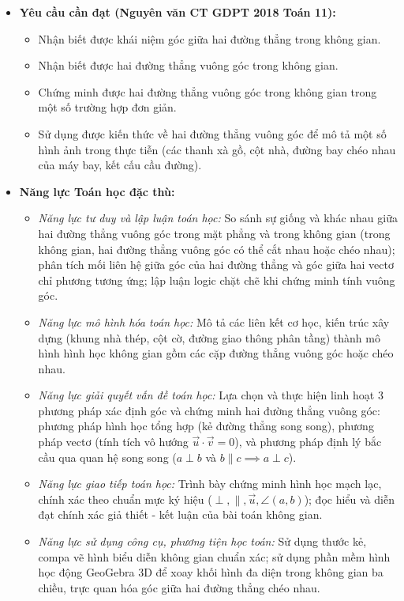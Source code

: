 \documentclass[12pt, a4paper]{article}
\renewcommand{\vec}[1]{\overrightarrow{#1}}
\begin{document}
\begin{itemize}[leftmargin=1.2cm]
    \item \textbf{Yêu cầu cần đạt (Nguyên văn CT GDPT 2018 Toán 11):}
    \begin{itemize}[leftmargin=0.6cm]
        \item Nhận biết được khái niệm góc giữa hai đường thẳng trong không gian.
        \item Nhận biết được hai đường thẳng vuông góc trong không gian.
        \item Chứng minh được hai đường thẳng vuông góc trong không gian trong một số trường hợp đơn giản.
        \item Sử dụng được kiến thức về hai đường thẳng vuông góc để mô tả một số hình ảnh trong thực tiễn (các thanh xà gồ, cột nhà, đường bay chéo nhau của máy bay, kết cấu cầu đường).
    \end{itemize}

    \item \textbf{Năng lực Toán học đặc thù:}
    \begin{itemize}[leftmargin=0.6cm]
        \item \textit{Năng lực tư duy và lập luận toán học:} So sánh sự giống và khác nhau giữa hai đường thẳng vuông góc trong mặt phẳng và trong không gian (trong không gian, hai đường thẳng vuông góc có thể cắt nhau hoặc chéo nhau); phân tích mối liên hệ giữa góc của hai đường thẳng và góc giữa hai vectơ chỉ phương tương ứng; lập luận logic chặt chẽ khi chứng minh tính vuông góc.
        \item \textit{Năng lực mô hình hóa toán học:} Mô tả các liên kết cơ học, kiến trúc xây dựng (khung nhà thép, cột cờ, đường giao thông phân tầng) thành mô hình hình học không gian gồm các cặp đường thẳng vuông góc hoặc chéo nhau.
        \item \textit{Năng lực giải quyết vấn đề toán học:} Lựa chọn và thực hiện linh hoạt 3 phương pháp xác định góc và chứng minh hai đường thẳng vuông góc: phương pháp hình học tổng hợp (kẻ đường thẳng song song), phương pháp vectơ (tính tích vô hướng $\vec{u} \cdot \vec{v} = 0$), và phương pháp định lý bắc cầu qua quan hệ song song ($a \perp b$ và $b \parallel c \implies a \perp c$).
        \item \textit{Năng lực giao tiếp toán học:} Trình bày chứng minh hình học mạch lạc, chính xác theo chuẩn mực ký hiệu ($\perp, \parallel, \vec{u}, \angle(a, b)$); đọc hiểu và diễn đạt chính xác giả thiết - kết luận của bài toán không gian.
        \item \textit{Năng lực sử dụng công cụ, phương tiện học toán:} Sử dụng thước kẻ, compa vẽ hình biểu diễn không gian chuẩn xác; sử dụng phần mềm hình học động GeoGebra 3D để xoay khối hình đa diện trong không gian ba chiều, trực quan hóa góc giữa hai đường thẳng chéo nhau.
    \end{itemize}


\end{itemize}
\end{document}
